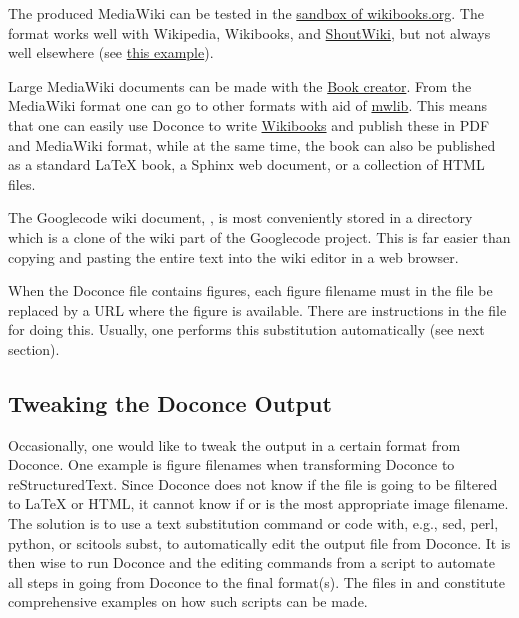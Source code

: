 \documentclass[%
oneside,                 %
final,                   %
chapterprefix=true,      %
open=right               %
10pt]{book}
\begin{document}
The produced MediaWiki can be tested in the \href{{http://en.wikibooks.org/wiki/Sandbox}}{sandbox of
wikibooks.org}. The format
works well with Wikipedia, Wikibooks, and
\href{{http://doconcedemo.shoutwiki.com/wiki/Doconce_demo_page}}{ShoutWiki},
but not always well elsewhere
(see \href{{http://doconcedemo.jumpwiki.com/wiki/First_demo}}{this example}).

Large MediaWiki documents can be made with the
\href{{http://en.wikipedia.org/w/index.php?title=Special:Book&bookcmd=book_creator}}{Book creator}.
From the MediaWiki format one can go to other formats with aid
of \href{{http://pediapress.com/code/}}{mwlib}. This means that one can
easily use Doconce to write \href{{http://en.wikibooks.org}}{Wikibooks}
and publish these in PDF and MediaWiki format, while
at the same time, the book can also be published as a
standard {\LaTeX} book, a Sphinx web document, or a collection of HTML files.



The Googlecode wiki document, , is most conveniently stored
in a directory which is a clone of the wiki part of the Googlecode project.
This is far easier than copying and pasting the entire text into the
wiki editor in a web browser.

When the Doconce file contains figures, each figure filename must in
the  file be replaced by a URL where the figure is
available. There are instructions in the file for doing this. Usually,
one performs this substitution automatically (see next section).

\subsection{Tweaking the Doconce Output}

Occasionally, one would like to tweak the output in a certain format
from Doconce. One example is figure filenames when transforming
Doconce to reStructuredText. Since Doconce does not know if the
 file is going to be filtered to {\LaTeX} or HTML, it cannot know
if  or  is the most appropriate image filename.
The solution is to use a text substitution command or code with, e.g., sed,
perl, python, or scitools subst, to automatically edit the output file
from Doconce. It is then wise to run Doconce and the editing commands
from a script to automate all steps in going from Doconce to the final
format(s). The  files in  and 
constitute comprehensive examples on how such scripts can be made.
\end{document}
